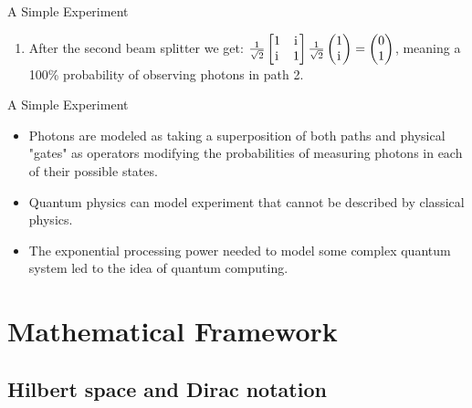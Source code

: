 \documentclass[svgnames,smaller,aspectratio=169]{beamer}
\begin{document}
\begin{frame}[fragile]{A Simple Experiment \cite{interfer}}
\begin{enumerate}
  \item After the second beam splitter we get: $\frac{1}{\sqrt{2}}\begin{bmatrix} 1 & \mathrm{i}\mkern1mu \\ \mathrm{i}\mkern1mu & 1 \end{bmatrix}
    \frac{1}{\sqrt{2}} \begin{pmatrix} 1 \\ \mathrm{i}\mkern1mu \end{pmatrix} = \begin{pmatrix} 0 \\ 1 \end{pmatrix}$, meaning a 100\%
    probability of observing photons in path 2.
  \end{enumerate}
\end{frame}

\begin{frame}[fragile]{A Simple Experiment \cite{interfer}}
  \begin{itemize}
  \item Photons are modeled as taking a superposition of both paths and physical "gates"  as operators modifying the
    probabilities of measuring photons in each of their possible states.
  \end{itemize}
    \begin{itemize}
  \item Quantum physics can model experiment that cannot be described by classical physics.
  \item The exponential processing power needed to model some complex quantum system led to the idea of quantum
    computing.
  \end{itemize}
\end{frame}
  
\section{Mathematical Framework}

\subsection{Hilbert space and Dirac notation}
\end{document}
